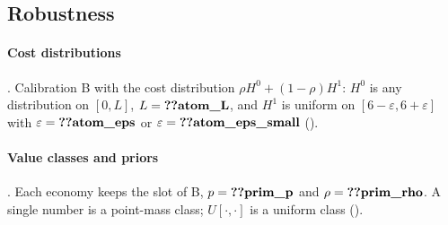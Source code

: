 \subsection{Robustness}\label{sec:B_parameters-robustness}

\paragraph{Cost distributions} . Calibration B with the cost distribution \(\rho H^0+(1-\rho)H^1\): \(H^0\) is any distribution on
\([0,L]\), \(L=\reg{atom_L}\), and \(H^1\) is uniform on \([6-\varepsilon,6+\varepsilon]\) with
\(\varepsilon=\reg{atom_eps}\) or \(\varepsilon=\reg{atom_eps_small}\) ().

\paragraph{Value classes and priors} . Each economy keeps the slot of B, \(p=\reg{prim_p}\) and
\(\rho=\reg{prim_rho}\). A single number is a point-mass class; \(U[\cdot,\cdot]\) is a uniform class
().
